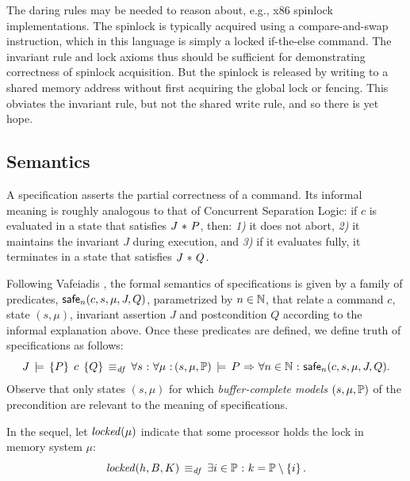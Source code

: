 \documentclass[11pt]{report}
\begin{document}
The daring rules may be needed to reason about, e.g., x86 spinlock implementations. The spinlock is typically acquired using a compare-and-swap instruction, which in this language is simply a locked if-the-else command. The invariant rule and lock axioms thus should be sufficient for demonstrating correctness of spinlock acquisition. But the spinlock is released by writing to a shared memory address without first acquiring the global lock or fencing. This obviates the invariant rule, but not the shared write rule, and so there is yet hope. 

\subsection{Semantics}
\label{sec:specification-semantics}

A specification asserts the partial correctness of a command. Its informal meaning is roughly analogous to that of Concurrent Separation Logic: if $c$ is evaluated in a state that satisfies $J \operatorname{\,\ast\,} P$, then: \emph{1)} it does not abort, \emph{2)} it maintains the invariant $J$ during execution, and \emph{3)} if it evaluates fully, it terminates in a state that satisfies $J \operatorname{\,\ast\,} Q$. 

Following Vafeiadis \cite{V11}, the formal semantics of specifications is given by a family of predicates, $\mathsf{safe}_{n}(c,s,\mu,J,Q)$, parametrized by $n \in \mathbb{N}$, that relate a command $c$, state $(s,\mu)$, invariant assertion $J$ and postcondition $Q$ according to the informal explanation above. Once these predicates are defined, we define truth of specifications as follows: \[ J\,\models\,\left\lbrace P \right\rbrace\;c\;\left\lbrace Q \right\rbrace \operatorname{\;\equiv_{\mathit{df}}\;} \forall s \operatorname{\,:\,} \forall \mu \operatorname{\,:\,} (s,\mu,\mathbb{P})\,\models\, P \operatorname{\,\Rightarrow\,} \forall n \in \mathbb{N} \operatorname{\,:\,} \mathsf{safe}_{n}(c,s,\mu,J,Q).\] Observe that only states $(s,\mu)$ for which \emph{buffer-complete models} $(s,\mu,\mathbb{P})$ of the precondition are relevant to the meaning of specifications. 

In the sequel, let $\mathit{locked}(\mu)$ indicate that some processor holds the lock in memory system $\mu$: \[ \mathit{locked}(h,B,K) \operatorname{\;\equiv_{\mathit{df}}\;} \exists i \in \mathbb{P} \operatorname{\,:\,} k = \mathbb{P} \setminus \left\lbrace i \right\rbrace. \]
\end{document}
